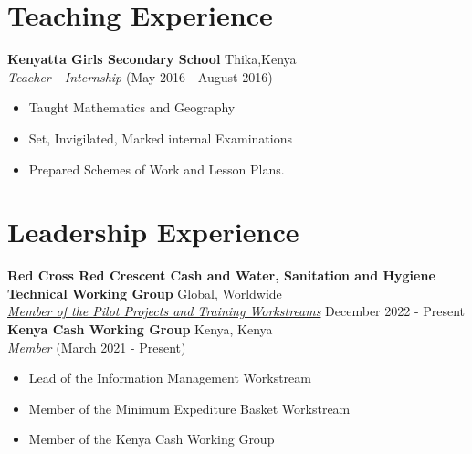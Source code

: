 \documentclass[line,margin,10pt]{res}
\begin{document}
\begin{resume}
\section{Teaching Experience}
\textbf{Kenyatta Girls Secondary School} \hfill Thika,Kenya\\
{\sl Teacher - Internship} \hfill (May 2016 - August 2016)
\begin{itemize} \itemsep -2pt
    \item Taught Mathematics and Geography
    \item Set, Invigilated, Marked internal Examinations
    \item Prepared Schemes of Work and Lesson Plans.
\end{itemize}
{\vspace{-0.25cm}}

\section{Leadership Experience}
\textbf{Red Cross Red Crescent Cash and Water, Sanitation and Hygiene Technical Working Group} \hfill Global, Worldwide\\
{\sl \href{https://sites.google.com/view/twgcashandwash/about-twg/membership#h.2r4pyiwuqh4k}{Member of the Pilot Projects and Training Workstreams}} \hfill December 2022 - Present \\

\textbf{Kenya Cash Working Group} \hfill Kenya, Kenya\\
{\sl Member} \hfill (March 2021 - Present)
\begin{itemize} \itemsep -2pt
    \item Lead of the Information Management Workstream
    \item Member of the Minimum Expediture Basket Workstream
    \item Member of the Kenya Cash Working Group
\end{itemize}
{\vspace{-0.25cm}}


\end{resume}
\end{document}

